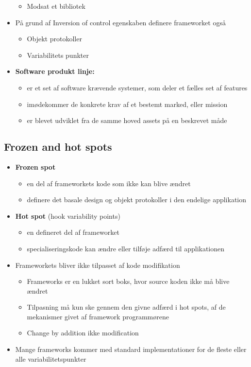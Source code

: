 \documentclass[a4, english]{article}
\begin{document}
\begin{itemize}
\begin{itemize}
    \item Modsat et bibliotek 
  \end{itemize}
  \item På grund af Inversion of control egenskaben definere frameworket også 
  \begin{itemize}
  	\item Objekt protokoller
    \item Variabilitets punkter  
  \end{itemize}
  \item \textbf{Software produkt linje: }
  \begin{itemize}
  	\item er et set af software krævende systemer, som deler et fælles set af features
    \item imødekommer de konkrete krav af et bestemt marked, eller mission
    \item er blevet udviklet fra de samme hoved assets på en beskrevet måde
  \end{itemize}
\end{itemize}  
\subsection{Frozen and hot spots}
\begin{itemize}
	\item \textbf{Frozen spot}
  \begin{itemize}
  	\item en del af frameworkets kode som ikke kan blive ændret
    \item definere det basale design og objekt protokoller i den endelige applikation  
  \end{itemize}
  \item \textbf{Hot spot} (hook variability points)
  \begin{itemize}
  	\item en defineret del af frameworket 
    \item specialiseringskode kan ændre eller tilføje adfærd til applikationen 
  \end{itemize}
  \item Frameworkets bliver ikke tilpasset af kode modifikation
  \begin{itemize}
  	\item Frameworks er en lukket sort boks, hvor source koden ikke må blive ændret
    \item Tilpasning må kun ske gennem den givne adfærd i hot spots, af de mekanismer givet af framework programmørene  
    \item Change by addition ikke modification    
  \end{itemize}
  \item Mange frameworks kommer med standard implementationer for de fleste eller alle variabilitetspunkter 
\end{itemize}
\end{document}
